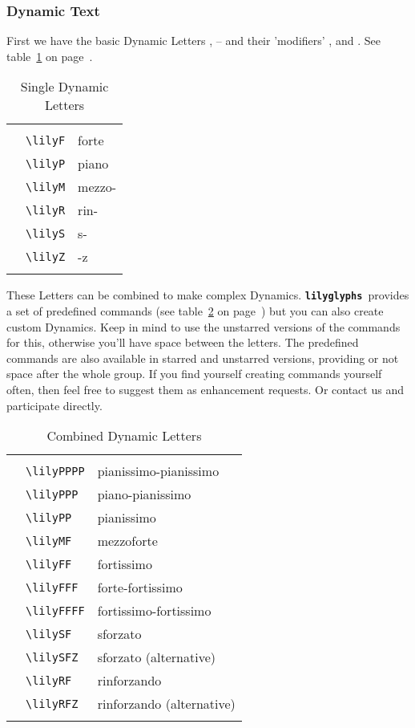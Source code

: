 \documentclass{article}
\newcommand{\lilyglyphs}{\texttt{\textbf{lilyglyphs }}}
\newcommand*{\cmd}[1]{\texttt{\textbackslash #1}}
\newcommand{\tmpCaption}{} %
\newcommand{\tmpLabel}{}
\newenvironment{reftable}[2]
	{%
		\renewcommand{\tmpCaption}{#1}
		\renewcommand{\tmpLabel}{#2}
		\begin{table}[ht]
		\begin{center}
		\begin{tabular}[t]{lll}
		\hline
		&\\
	}
	{%
		&\\
		\hline
		\end{tabular}
		\caption{\tmpCaption}
		\label{table:\tmpLabel}
		\end{center}
		\end{table}
	}
\begin{document}
\subsubsection{Dynamic Text}
First we have the basic Dynamic Letters \lilyP, \lilyF* -- and their 'modifiers'
\lilyM, \lilyS* and \lilyZ. See table~\ref{table:singleDynLetters} on page~\pageref{table:singleDynLetters}.

\begin{reftable}{Single Dynamic Letters}{singleDynLetters}
\lilyF* & \cmd{lilyF} & forte\\
\lilyP* & \cmd{lilyP} & piano\\
\lilyM* & \cmd{lilyM} & mezzo-\\
\lilyR* & \cmd{lilyR} & rin-\\
\lilyS* & \cmd{lilyS} & s-\\
\lilyZ* & \cmd{lilyZ} & -z\\
\end{reftable}

These Letters can be combined to make complex Dynamics. \lilyglyphs provides a set of predefined commands (see table~\ref{table:combinedDynLetters} on page~\pageref{table:combinedDynLetters}) but you can also create custom Dynamics. Keep in mind to use the unstarred versions of the commands for this, otherwise you'll have space between the letters. The predefined commands are also available in starred and unstarred versions, providing or not space after the whole group.
If you find yourself creating commands yourself often, then feel free to suggest them as enhancement requests. Or contact us and participate directly.

\begin{reftable}{Combined Dynamic Letters}{combinedDynLetters}
\lilyPPPP* & \cmd{lilyPPPP} & pianissimo-pianissimo\\
\lilyPPP* & \cmd{lilyPPP} & piano-pianissimo\\
\lilyPP* & \cmd{lilyPP} & pianissimo\\
\lilyMF* & \cmd{lilyMF} & mezzoforte\\
\lilyFF* & \cmd{lilyFF} & fortissimo\\
\lilyFFF* & \cmd{lilyFFF} & forte-fortissimo\\
\lilyFFFF* & \cmd{lilyFFFF} & fortissimo-fortissimo\\

\lilySF* & \cmd{lilySF} & sforzato\\
\lilySFZ* & \cmd{lilySFZ} & sforzato (alternative)\\
\lilyRF* & \cmd{lilyRF} & rinforzando\\
\lilyRFZ* & \cmd{lilyRFZ} & rinforzando (alternative)\\

\end{reftable}
\end{document}
